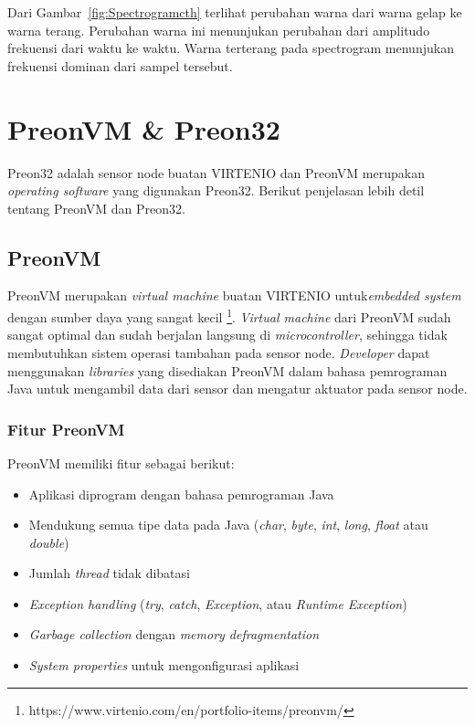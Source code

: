 Dari Gambar~\ref{fig:Spectrogramcth} terlihat perubahan warna dari warna gelap ke warna terang. Perubahan warna ini menunjukan perubahan 
dari amplitudo frekuensi dari waktu ke waktu. Warna terterang pada spectrogram menunjukan frekuensi dominan dari sampel tersebut.
\section{PreonVM \& Preon32}
Preon32 adalah sensor node buatan VIRTENIO dan PreonVM merupakan {\it operating software} yang digunakan Preon32. Berikut penjelasan lebih
detil tentang PreonVM dan Preon32.

\subsection{PreonVM} 
PreonVM merupakan {\it virtual machine} buatan VIRTENIO untuk{\it embedded system} dengan sumber daya yang sangat kecil \footnote{https://www.virtenio.com/en/portfolio-items/preonvm/}. {\it Virtual machine} dari PreonVM sudah sangat optimal dan sudah berjalan langsung di {\it microcontroller}, sehingga tidak membutuhkan sistem operasi tambahan pada sensor node. {\it Developer} dapat menggunakan {\it libraries} yang disediakan PreonVM dalam bahasa pemrograman Java untuk mengambil data dari sensor dan mengatur aktuator pada sensor node.

\subsubsection{Fitur PreonVM}
PreonVM memiliki fitur sebagai berikut:
\begin{itemize}
	\item Aplikasi diprogram dengan bahasa pemrograman Java
	\item Mendukung semua tipe data pada Java ({\it char}, {\it byte}, {\it int}, {\it long}, {\it float} atau {\it double})
	\item Jumlah {\it thread} tidak dibatasi
	\item {\it Exception handling} ({\it try}, {\it catch}, {\it Exception}, atau {\it Runtime Exception})
	\item {\it Garbage collection} dengan {\it memory defragmentation}
	\item {\it System properties} untuk mengonfigurasi aplikasi
\end{itemize}

